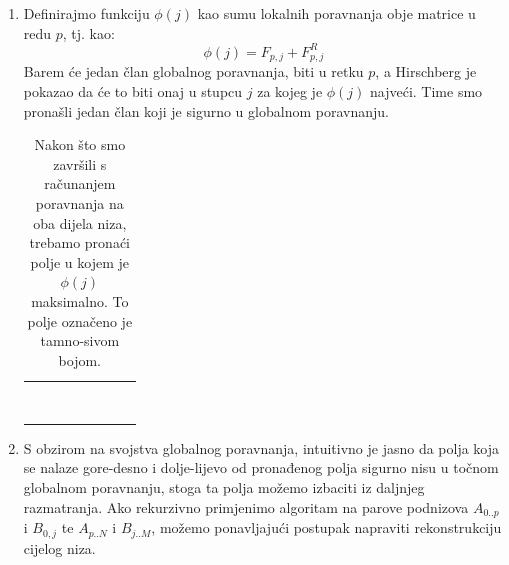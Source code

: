 \documentclass[times, utf8, zavrsni]{fer}
\begin{document}
\begin{enumerate}
\item
Definirajmo funkciju $\phi(j)$ kao sumu lokalnih poravnanja obje matrice u redu
$p$, tj. kao:
$$ \phi(j) = F_{p,j} + F^{R}_{p,j} $$
Barem će jedan član globalnog poravnanja, biti u retku $p$, a Hirschberg
je pokazao da će to biti onaj u stupcu $j$ za kojeg je $\phi(j)$ najveći.
Time smo pronašli jedan član koji je sigurno u globalnom poravnanju. 

\begin{table}
\centering
\begin{tabularx}{160pt}{|R|R|R|R|R|R|R|R|}
 \hline
  &  &  &  &  &  &  &  \\ \hline
  &  &  &  &  &  &  &  \\ \hline
  &  &  &  &  &  &  &  \\ \hline
  &  &  &  &  &  &  &  \\ \hline
   &   &   &   &   &   &   &   \\ \hline
  &  &  &  &  &  &  &  \\ \hline
  &  &  &  &  &  &  &  \\ \hline
  &  &  &  &  &  &  &  \\ \hline
  &  &  &  &  &  &  &  \\ \hline
\end{tabularx}
\caption[Hirschbergov algoritam: pronalazak elementa globalnog poravnanja]{
Nakon što smo završili s računanjem
poravnanja na oba dijela niza, trebamo pronaći polje u kojem je $\phi(j)$
maksimalno. To polje označeno je tamno-sivom bojom.}
\label{table:Halg:2}
\end{table}

\item
S obzirom na svojstva globalnog poravnanja, intuitivno je jasno da
polja koja se nalaze gore-desno i dolje-lijevo od pronađenog polja 
sigurno nisu u točnom globalnom poravnanju, stoga ta polja
možemo izbaciti iz daljnjeg razmatranja. Ako rekurzivno primjenimo
algoritam na parove podnizova $A_{0..p}$ i $B_{0,j}$ te $A_{p..N}$ i
$B_{j..M}$, možemo ponavljajući postupak napraviti rekonstrukciju
cijelog niza.


\end{enumerate}
\end{document}
